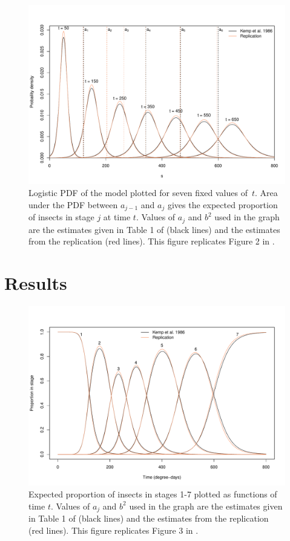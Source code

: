 \begin{figure}[p]
  \centering
  \includegraphics[width=\textwidth]{../figures/dennis_fig2.pdf}
  \caption{Logistic PDF of the \citet{dennis1986stochastic} model plotted for seven fixed values of~$t$. Area under the PDF between $a_{j-1}$ and $a_j$ gives the expected proportion of insects in stage $j$ at time $t$. Values of $a_j$ and $b^2$ used in the graph are the estimates given in Table 1 of \citep{kemp1986stochastic} (black lines) and the estimates from the replication (red lines). This figure replicates Figure 2 in \citep{dennis1986stochastic}.}
  \label{fig:fig1}
\end{figure}

\section{Results}
\begin{figure}[p]
  \centering
  \includegraphics[width=\textwidth]{../figures/dennis_fig3.pdf}
  \caption{Expected proportion of insects in stages 1-7 plotted as functions of time $t$. Values of $a_j$ and $b^2$ used in the graph are the estimates given in Table 1 of \citep{kemp1986stochastic} (black lines) and the estimates from the replication (red lines). This figure replicates Figure 3 in \citep{dennis1986stochastic}.}
  \label{fig:fig2}
\end{figure}

